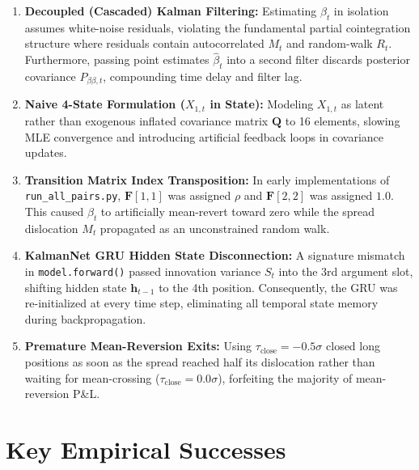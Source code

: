\documentclass[11pt, a4paper]{article}
\begin{document}
\begin{enumerate}
    \item \textbf{Decoupled (Cascaded) Kalman Filtering:} Estimating $\beta_t$ in isolation assumes white-noise residuals, violating the fundamental partial cointegration structure where residuals contain autocorrelated $M_t$ and random-walk $R_t$. Furthermore, passing point estimates $\hat{\beta}_t$ into a second filter discards posterior covariance $P_{\beta\beta, t}$, compounding time delay and filter lag.
    \item \textbf{Naive 4-State Formulation ($X_{1,t}$ in State):} Modeling $X_{1,t}$ as latent rather than exogenous inflated covariance matrix $\mathbf{Q}$ to 16 elements, slowing MLE convergence and introducing artificial feedback loops in covariance updates.
    \item \textbf{Transition Matrix Index Transposition:} In early implementations of \texttt{run\_all\_pairs.py}, $\mathbf{F}[1,1]$ was assigned $\rho$ and $\mathbf{F}[2,2]$ was assigned $1.0$. This caused $\beta_t$ to artificially mean-revert toward zero while the spread dislocation $M_t$ propagated as an unconstrained random walk.
    \item \textbf{KalmanNet GRU Hidden State Disconnection:} A signature mismatch in \texttt{model.forward()} passed innovation variance $S_t$ into the 3rd argument slot, shifting hidden state $\mathbf{h}_{t-1}$ to the 4th position. Consequently, the GRU was re-initialized at every time step, eliminating all temporal state memory during backpropagation.
    \item \textbf{Premature Mean-Reversion Exits:} Using $\tau_{\text{close}} = -0.5\sigma$ closed long positions as soon as the spread reached half its dislocation rather than waiting for mean-crossing ($\tau_{\text{close}} = 0.0\sigma$), forfeiting the majority of mean-reversion P\&L.
\end{enumerate}

\section{Key Empirical Successes}
\end{document}
